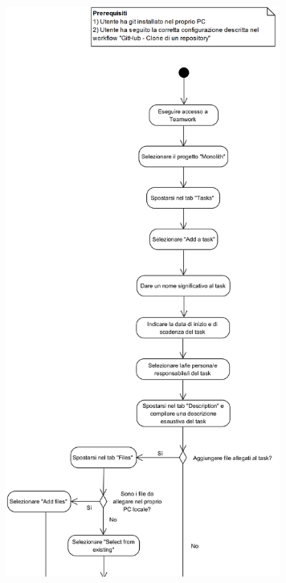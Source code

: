 \begin{samepage}
	\mbox{}\\
	
	\begin{center}
		\includegraphics[width=9cm]{../../documenti/NormeDiProgetto/DiagrammiProcedure/CreazioneTask1.png}
	\end{center}
	
\end{samepage}


